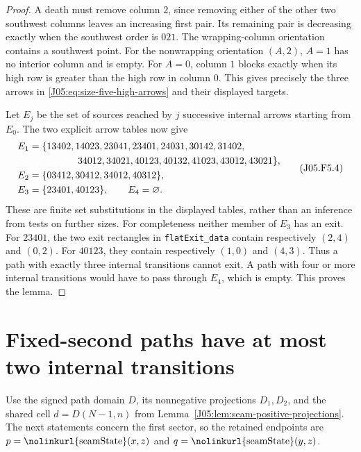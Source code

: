 \documentclass[11pt,oneside]{report}
\theoremstyle{definition}
\numberwithin{equation}{section}
\newcommand{\decl}[1]{\textnormal{\nolinkurl{#1}}}
\begin{document}
\begin{proof}
A death must remove column $2$, since removing either of the other
two southwest columns leaves an increasing first pair.
Its remaining pair is decreasing exactly when the southwest order
is $021$. The wrapping-column orientation contains a southwest point.
For the nonwrapping orientation $(A,2)$, $A=1$ has no interior
column and is empty. For $A=0$, column $1$ blocks exactly when its
high row is greater than the high row in column $0$.
This gives precisely the three arrows in
\eqref{J05:eq:size-five-high-arrows} and their displayed targets.

Let $E_j$ be the set of sources reached by $j$ successive internal
arrows starting from $E_0$. The two explicit arrow tables now give
\[
\begin{split}
E_1={}&\{13402,14023,23041,23401,24031,30142,31402,\\
      &\hspace{13mm}34012,34021,40123,40132,41023,43012,43021\},\\
E_2={}&\{03412,30412,34012,40312\},\\
E_3={}&\{23401,40123\},\qquad E_4=\varnothing.
\end{split}
\tag{J05.F5.4}\label{J05:eq:size-five-reachability}
\]
These are finite set substitutions in the displayed tables, rather
than an inference from tests on further sizes.
For completeness neither member of $E_3$ has an exit.
For $23401$, the two exit rectangles in \decl{flatExit_data} contain
respectively $(2,4)$ and $(0,2)$.
For $40123$, they contain respectively $(1,0)$ and $(4,3)$.
Thus a path with exactly three internal transitions cannot exit.
A path with four or more internal transitions would have to pass
through $E_4$, which is empty. This proves the lemma.
\end{proof}

\section{Fixed-second paths have at most two internal transitions}

Use the signed path domain $D$, its nonnegative projections $D_1,D_2$,
and the shared cell $d=D(N-1,n)$ from
Lemma~\ref{J05:lem:seam-positive-projections}.
The next statements concern the first sector, so the retained endpoints
are $p=\decl{seamState}(x,z)$ and $q=\decl{seamState}(y,z)$.
\end{document}
